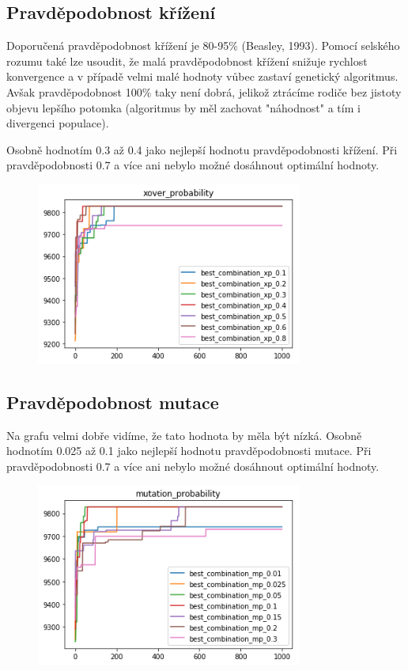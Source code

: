 \documentclass[a4paper,10pt,twocolumn]{article}
\begin{document}
\begin{itemize}
\begin{itemize}
\subsection{Pravděpodobnost křížení}
Doporučená pravděpodobnost křížení je 80-95\% (Beasley, 1993). Pomocí selského rozumu také lze usoudit, že malá pravděpodobnost křížení snižuje rychlost konvergence a v případě velmi malé hodnoty vůbec zastaví genetický algoritmus. Avšak pravděpodobnost 100\% taky není dobrá, jelikož ztrácíme rodiče bez jistoty objevu lepšího potomka (algoritmus by měl zachovat "náhodnost" a tím i divergenci populace).

Osobně hodnotím 0.3 až 0.4 jako nejlepší hodnotu pravděpodobnosti křížení. Při pravděpodobnosti 0.7 a více ani nebylo možné dosáhnout optimální hodnoty.

\begin{figure}[H]
  \begin{center}
    \includegraphics[height=6cm]{graphs/xover_probability.png}
  \end{center}
\end{figure}

\subsection{Pravděpodobnost mutace}


Na grafu velmi dobře vidíme, že tato hodnota by měla být nízká.
Osobně hodnotím 0.025 až 0.1 jako nejlepší hodnotu pravděpodobnosti mutace. Při pravděpodobnosti 0.7 a více ani nebylo možné dosáhnout optimální hodnoty.

\begin{figure}[H]
  \begin{center}
    \includegraphics[height=6cm]{graphs/mutation_probability.png}
  \end{center}
\end{figure}



\end{itemize}
\end{itemize}
\end{document}
